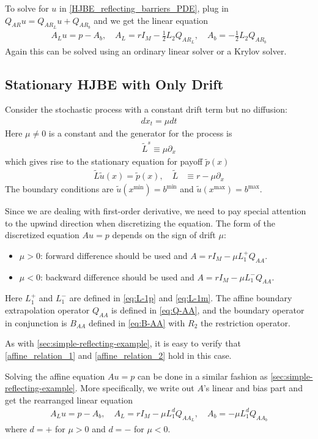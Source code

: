 \documentclass[11pt]{article}
\newcommand{\D}[1][]{\ensuremath{\partial_{#1}}}
\begin{document}
To solve for $u$ in \cref{HJBE_reflecting_barriers_PDE}, plug in $Q_{AR}u = Q_{AR_L}u + Q_{AR_b}$ and we get the linear equation
\begin{align}
A_Lu = p - A_b,\quad A_L = rI_M - \frac{1}{2}L_2Q_{AR_L},\quad A_b = -\frac{1}{2}L_2Q_{AR_b}
\end{align}
Again this can be solved using an ordinary linear solver or a Krylov solver.

\subsection{Stationary HJBE with Only Drift}
Consider the stochastic process with a constant drift term but no diffusion:
\begin{align}
d x_t = \mu dt
\end{align}
Here $\mu \ne 0$ is a constant and the generator for the process is
\begin{align}
	\tilde{L}^s \equiv \mu \D[x]\label{eq:L-s-drift}
\end{align}
which gives rise to the stationary equation for payoff $\tilde{p}(x)$
\begin{align}
	\tilde{L} \tilde{u}(x) = \tilde{p}(x),\quad \tilde{L}&\equiv r - \mu\partial_{x}\label{HJBE_PDE_with_drifts}
\end{align}
The boundary conditions are $\tilde{u}(x^{\min}) = b^{\min}$ and $\tilde{u}(x^{\max}) = b^{\max}$.

Since we are dealing with first-order derivative, we need to pay special attention to the upwind direction when discretizing the equation. The form of the discretized equation $Au = p$ depends on the sign of drift $\mu$:
\begin{itemize}
	\item $\mu > 0$: forward difference should be used and $A = rI_M - \mu L^+_1Q_{AA}$.
	\item $\mu < 0$: backward difference should be used and $A = rI_M - \mu L^-_1Q_{AA}$.
\end{itemize}
Here $L^+_1$ and $L^-_1$ are defined in \cref{eq:L-1p} and \cref{eq:L-1m}. The affine boundary extrapolation operator $Q_{AA}$ is defined in \cref{eq:Q-AA}, and the boundary operator in conjunction is $B_{AA}$ defined in \cref{eq:B-AA} with $R_2$ the restriction operator.

As with \ref{sec:simple-reflecting-example}, it is easy to verify that \cref{affine_relation_1} and \cref{affine_relation_2} hold in this case.

Solving the affine equation $Au = p$ can be done in a similar fashion as \ref{sec:simple-reflecting-example}. More specifically, we write out $A$'s linear and bias part and get the rearranged linear equation
\begin{align}
A_Lu = p - A_b,\quad A_L = rI_M - \mu L^d_1Q_{AA_L},\quad A_b = -\mu L^d_1Q_{AA_b}
\end{align}
where $d = +$ for $\mu > 0$ and $d = -$ for $\mu < 0$.
\end{document}
